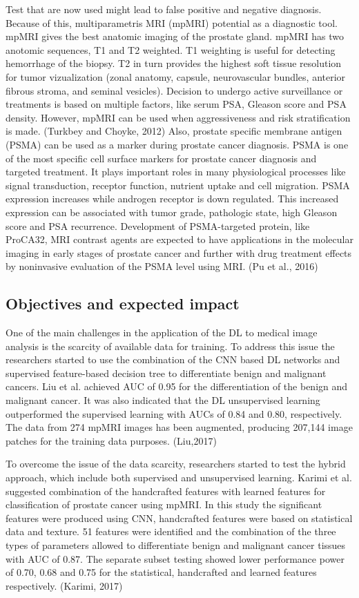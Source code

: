 \documentclass[11pt]{article}
\begin{document}
Test that are now used might lead to false positive and negative diagnosis. Because of this, multiparametris MRI (mpMRI) potential as a diagnostic tool. mpMRI gives the best anatomic imaging of the prostate gland. mpMRI has two anotomic sequences, T1 and T2 weighted. T1 weighting is useful for detecting hemorrhage of the biopsy. T2 in turn provides the highest soft tissue resolution for tumor vizualization (zonal anatomy, capsule, neurovascular bundles, anterior fibrous stroma, and seminal vesicles). Decision to undergo active surveillance or treatments is based on multiple factors, like serum PSA, Gleason score and PSA density. However, mpMRI can be used when aggressiveness and risk stratification is made. (Turkbey and Choyke, 2012) Also, prostate specific membrane antigen (PSMA) can be used as a marker during prostate cancer diagnosis. PSMA is one of the most specific cell surface markers for prostate cancer diagnosis and targeted treatment. It plays important roles in many physiological processes like signal transduction, receptor function, nutrient uptake and cell migration. PSMA expression increases while androgen receptor is down regulated. This increased expression can be associated with tumor grade, pathologic state, high Gleason score and PSA recurrence. Development of PSMA-targeted protein, like ProCA32, MRI contrast agents are expected to have applications in the molecular imaging in early stages of prostate cancer and further with drug treatment effects by noninvasive evaluation of the PSMA level using MRI. (Pu et al., 2016)


\subsection{Objectives and expected impact}
\vspace{5mm}
One of the main challenges in the application of the DL to medical image analysis is the scarcity of available data for training. To address this issue the researchers started to use the combination of the CNN based DL networks and supervised feature-based decision tree to differentiate benign and malignant cancers. Liu et al. achieved AUC of 0.95 for the differentiation of the benign and malignant cancer. It was also indicated that the DL unsupervised learning outperformed the supervised learning with AUCs of 0.84 and 0.80, respectively. The data from 274 mpMRI images has been augmented, producing 207,144 image patches for the training data purposes. (Liu,2017)

To overcome the issue of the data scarcity, researchers started to test the hybrid approach, which include both supervised and unsupervised learning. Karimi et al. suggested combination of the handcrafted features with learned features for classification of prostate cancer using mpMRI. In this study the significant features were produced using CNN, handcrafted features were based on statistical data and texture. 51 features were identified and the combination of the three types of parameters allowed to differentiate benign and malignant cancer tissues with AUC of 0.87. The separate subset testing showed lower performance power of 0.70, 0.68 and 0.75 for the statistical, handcrafted and learned features respectively. (Karimi, 2017)
 
\end{document}
